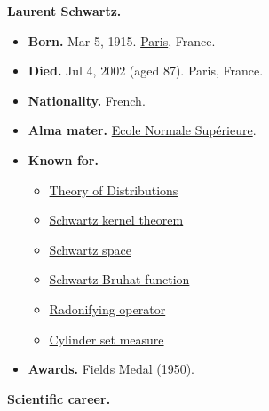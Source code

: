 \documentclass{book}
\numberwithin{equation}{section}
\begin{document}
\textbf{Laurent Schwartz.}
\begin{itemize}
    \item \textbf{Born.} Mar 5, 1915. \href{https://en.wikipedia.org/wiki/Paris}{Paris}, France.
    \item \textbf{Died.} Jul 4, 2002 (aged 87). Paris, France.
    \item \textbf{Nationality.} French.
    \item \textbf{Alma mater.} \href{https://en.wikipedia.org/wiki/%C3%89cole_Normale_Sup%C3%A9rieure}{Ecole Normale Sup\'erieure}.
    \item \textbf{Known for.}
    \begin{itemize}
        \item \href{https://en.wikipedia.org/wiki/Distribution_(mathematics)}{Theory of Distributions}
        \item \href{https://en.wikipedia.org/wiki/Schwartz_kernel_theorem}{Schwartz kernel theorem}
        \item \href{https://en.wikipedia.org/wiki/Schwartz_space}{Schwartz space}
        \item \href{https://en.wikipedia.org/wiki/Schwartz-Bruhat_function}{Schwartz-Bruhat function}
        \item \href{https://en.wikipedia.org/wiki/Radonifying_function}{Radonifying operator}
        \item \href{https://en.wikipedia.org/wiki/Cylinder_set_measure}{Cylinder set measure}
    \end{itemize}
    \item \textbf{Awards.} \href{https://en.wikipedia.org/wiki/Fields_Medal}{Fields Medal} (1950).
\end{itemize}
\textbf{Scientific career.}
\end{document}
